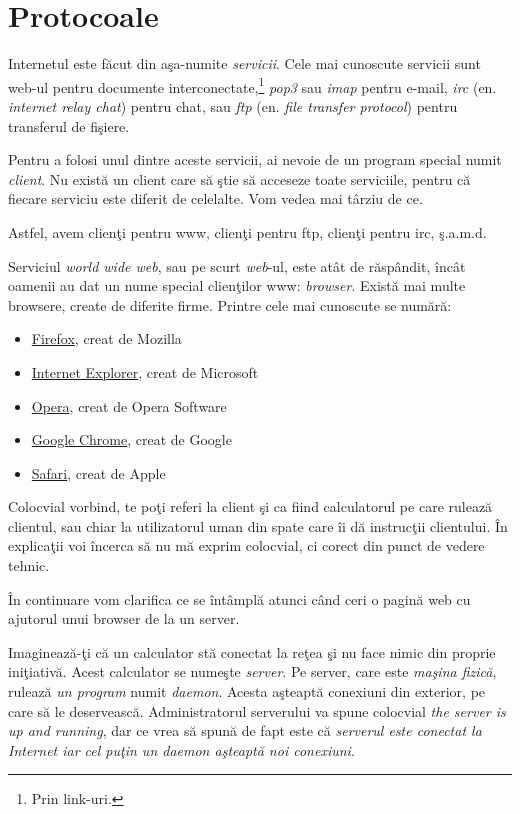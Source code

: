 \section{Protocoale}
Internetul este {\glqq}făcut{\grqq} din aşa-numite \textsl{servicii}. Cele mai cunoscute servicii sunt
web-ul pentru documente interconectate,\footnote{Prin link-uri.}
\textsl{pop3} sau \textsl{imap} pentru e-mail,
\textsl{irc} (en. \textsl{internet relay chat}) pentru chat, sau
\textsl{ftp} (en. \textsl{file transfer protocol}) pentru transferul de fişiere.

Pentru a folosi unul dintre aceste servicii, ai nevoie de un program
special numit \textsl{client}. Nu există un client care să {\glqq}ştie{\grqq} 
să acceseze toate serviciile, pentru
că fiecare serviciu este diferit de celelalte. Vom vedea mai târziu de ce.

Astfel, avem clienţi pentru www, clienţi pentru ftp, clienţi pentru irc, ş.a.m.d.

Serviciul \textit{world wide web}, sau pe scurt \textit{web}-ul, este atât de răspândit, încât
oamenii au dat un nume special clienţilor www: \textsl{browser}. Există mai multe browsere,
create de diferite firme. Printre cele mai cunoscute se numără:
\begin{itemize}
\item \href{http://en.wikipedia.org/wiki/Firefox}{Firefox}, creat de Mozilla
\item \href{http://en.wikipedia.org/wiki/Internet_explorer}{Internet Explorer}, creat de Microsoft
\item \href{http://en.wikipedia.org/wiki/Opera_(web_browser)}{Opera}, creat de Opera Software
\item \href{http://en.wikipedia.org/wiki/Chrome_(web_browser)}{Google Chrome}, creat de Google
\item \href{http://en.wikipedia.org/wiki/Safari_(browser)}{Safari}, creat de Apple
\end{itemize}

Colocvial vorbind, te poţi referi la client şi
ca fiind calculatorul pe care rulează clientul, sau chiar la utilizatorul uman din spate
care îi dă instrucţii clientului. În explicaţii voi încerca să nu mă exprim colocvial, ci
corect din punct de vedere tehnic.

În continuare vom clarifica ce se întâmplă atunci când ceri o pagină web cu ajutorul
unui browser de la un server.

Imaginează-ţi că un calculator stă conectat la reţea şi
nu face nimic din {\glqq}proprie iniţiativă{\grqq}.
Acest calculator se numeşte \textsl{server}. Pe server, care este
\textit{maşina fizică}, rulează \textit{un program} numit \textsl{daemon}.
Acesta aşteaptă conexiuni din
exterior, pe care să le deservească. Administratorul serverului va spune colocvial
\textit{the server is up and running}, dar ce vrea să spună de fapt este că \textit{serverul
este conectat la Internet iar cel puţin un daemon aşteaptă noi conexiuni}.

